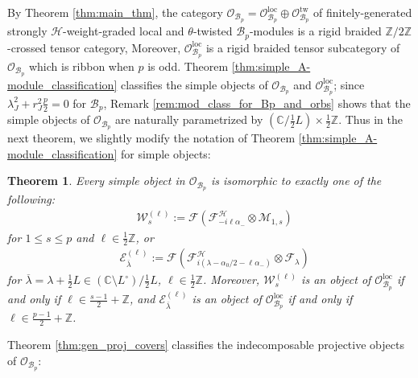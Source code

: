 \documentclass[11pt, reqno]{amsart}
\newtheorem{thm}{Theorem}[section]
\theoremstyle{definition}\newtheorem{defi}[thm]{Definition}
\theoremstyle{definition}\newtheorem{rem}[thm]{Remark}
\theoremstyle{definition}\newtheorem{exam}[thm]{Example}
\theoremstyle{definition}\newtheorem{assum}[thm]{Assumption}
\newcommand{\cB}{\mathcal{B}}
\newcommand{\cE}{\mathcal{E}}
\newcommand{\cH}{\mathcal{H}}
\newcommand{\cM}{\mathcal{M}}
\newcommand{\cF}{\mathcal{F}}
\newcommand{\cO}{\mathcal{O}}
\newcommand{\cW}{\mathcal{W}}
\newcommand{\CC}{\mathbb{C}}
\newcommand{\ZZ}{\mathbb{Z}}
\newcommand{\Oloc}{\cO^{\mathrm{loc}}}
\newcommand{\Otw}{\cO^{\mathrm{tw}}}
\begin{document}
By Theorem \ref{thm:main_thm}, the category $\cO_{\cB_p}=\Oloc_{\cB_p}\oplus\Otw_{\cB_p}$ of finitely-generated strongly $\cH$-weight-graded local and $\theta$-twisted $\cB_p$-modules is a rigid braided $\ZZ/2\ZZ$-crossed tensor category, Moreover, $\Oloc_{\cB_p}$ is a rigid braided tensor subcategory of $\cO_{\cB_p}$ which is ribbon when $p$ is odd. Theorem \ref{thm:simple_A-module_classification} classifies the simple objects of $\cO_{\cB_p}$ and $\Oloc_{\cB_p}$; since $\lambda_J^2+r_J^2\frac{p}{2}=0$ for $\cB_p$, Remark \ref{rem:mod_class_for_Bp_and_orbs} shows that the simple objects of $\cO_{\cB_p}$ are naturally parametrized by $(\CC/\frac{1}{2}L)\times\frac{1}{2}\ZZ$. Thus in the next theorem, we slightly modify the notation of Theorem \ref{thm:simple_A-module_classification} for simple objects:


\begin{thm}\label{thm:Bp_mod_class}
 Every simple object in $\cO_{\mathcal{B}_p}$ is isomorphic to exactly one of the following:
 \begin{align*}
&  \cW_s^{(\ell)} :=\cF\left(\cF^\cH_{-i\ell\alpha_-}\otimes\cM_{1,s}\right)
\end{align*}
for $1\leq s\leq p$ and $\ell\in\frac{1}{2}\ZZ$, or
\begin{align*}
& \cE_{\overline{\lambda}}^{(\ell)}:=\cF\left(\cF^{\cH}_{i(\lambda-\alpha_0/2-\ell\alpha_-)}\otimes\cF_{\lambda}\right)
 \end{align*}
 for $\overline{\lambda}=\lambda+\frac{1}{2}L\in(\CC\setminus L^\circ)\big/\frac{1}{2}L$, $\ell\in\frac{1}{2}\ZZ$. Moreover, $\cW_s^{(\ell)}$ is an object of $\Oloc_{\cB_p}$ if and only if $\ell\in\frac{s-1}{2}+\ZZ$, and $\cE^{(\ell)}_{\overline{\lambda}}$ is an object of $\Oloc_{\cB_p}$ if and only if $\ell\in\frac{p-1}{2}+\ZZ$.
 \end{thm}
 
Theorem \ref{thm:gen_proj_covers} classifies the indecomposable projective objects of $\cO_{\cB_p}$:
 
\end{document}

